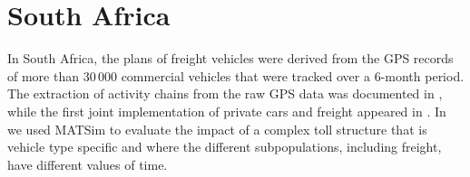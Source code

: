 \section{South Africa}
In South Africa, the plans of freight vehicles were derived from the GPS records of more than 30\,000 commercial vehicles  that were tracked over a 6-month period. The extraction of activity chains from the raw GPS data was documented in \citet[][]{JoubertAxhausen_JTG_2011}, while the first joint implementation of private cars and freight appeared in \citet[][]{JoubertJEtAl_TRR_2010}. In \citet[][]{NagelKickhoeferJoubert2014HeterogeneousVoTsPROCEDIA} we used MATSim to evaluate the impact of a complex toll structure that is vehicle type specific and where the different subpopulations, including freight, have different values of time.


